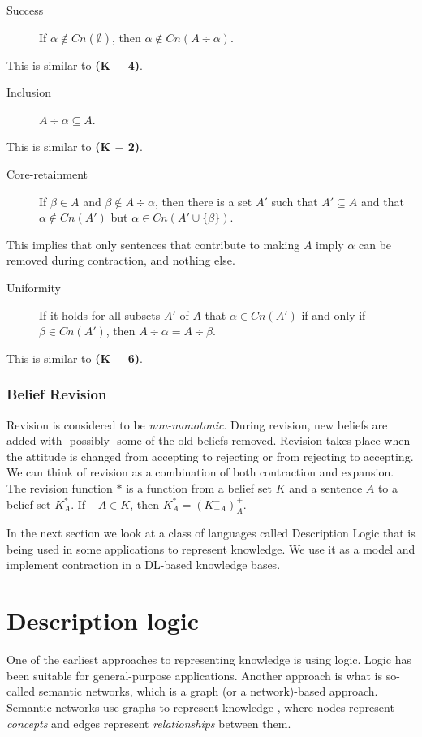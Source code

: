\begin{description}
\item[Success] If $\alpha \notin Cn(\emptyset)$, then $\alpha \notin Cn(A \div \alpha)$.
\end{description}
This is similar to \textbf{(K $-$ 4)}.

\begin{description}
\item[Inclusion] $A \div \alpha \subseteq A$.
\end{description}
This is similar to \textbf{(K $-$ 2)}.

\begin{description}
\item[Core-retainment] If $\beta \in A$ and $\beta \notin A \div \alpha$, then there is a set $A'$ such that $A' \subseteq A$ and that $\alpha \notin Cn(A')$ but $\alpha \in Cn(A' \cup \{ \beta \})$.
\end{description}
This implies that only sentences that contribute to making $A$ imply $\alpha$ can be removed during contraction, and nothing else. 

\begin{description}
\item[Uniformity] If it holds for all subsets $A'$ of $A$ that $\alpha \in Cn(A')$ if and only if $\beta \in Cn(A')$, then $A \div \alpha = A \div \beta$.
\end{description}
This is similar to \textbf{(K $-$ 6)}.

\subsubsection{Belief Revision}
Revision is considered to be \textit{non-monotonic}. During revision, new beliefs are added with -possibly- some of the old beliefs removed. Revision takes place when the attitude is changed from accepting to rejecting or from rejecting to accepting. We can think of revision as a combination of both contraction and expansion. The revision function $*$ is a function from a belief set $K$ and a sentence $A$ to a belief set $K^{*}_{A}$. If $-A \in K$, then $K^{*}_{A} = (K^{-}_{-A})^{+}_{A}$.

In the next section we look at a class of languages called Description Logic that is being used in some applications to represent knowledge. We use it as a model and implement contraction in a DL-based knowledge bases.


\section{Description logic}
\label{dl}
One of the earliest approaches to representing knowledge is using logic. Logic has been suitable for general-purpose applications. Another approach is what is so-called semantic networks, which is a graph (or a network)-based approach. Semantic networks use graphs to represent knowledge \cite{dl}, where nodes represent \textit{concepts} and edges represent \textit{relationships} between them.

